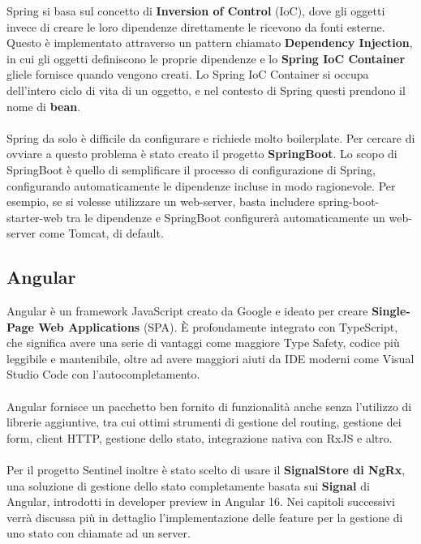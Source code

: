 Spring si basa sul concetto di \textbf{Inversion of Control} (IoC), dove gli oggetti invece di creare le loro dipendenze direttamente le ricevono da fonti esterne.
Questo \`e implementato attraverso un pattern chiamato \textbf{Dependency Injection}, in cui gli oggetti definiscono le proprie dipendenze e lo \textbf{Spring IoC Container}
gliele fornisce quando vengono creati.
Lo Spring IoC Container si occupa dell'intero ciclo di vita di un oggetto, e nel contesto di Spring questi prendono il nome di \textbf{bean}.
\\\\
Spring da solo \`e difficile da configurare e richiede molto boilerplate. Per cercare di ovviare a questo problema \`e stato creato il progetto \textbf{SpringBoot}.
Lo scopo di SpringBoot \`e quello di semplificare il processo di configurazione di Spring, configurando automaticamente le dipendenze incluse in modo ragionevole.
Per esempio, se si volesse utilizzare un web-server, basta includere spring-boot-starter-web tra le dipendenze e SpringBoot configurer\`a automaticamente un web-server come Tomcat, di default.
\subsection{Angular}
Angular \`e un framework JavaScript creato da Google e ideato per creare \textbf{Single-Page Web Applications} (SPA). \`E profondamente integrato con TypeScript,
che significa avere una serie di vantaggi come maggiore Type Safety, codice pi\`u leggibile e mantenibile, oltre ad avere maggiori aiuti da IDE moderni come Visual Studio Code
con l'autocompletamento.
\\\\
Angular fornisce un pacchetto ben fornito di funzionalit\`a anche senza l'utilizzo di librerie aggiuntive, tra cui ottimi strumenti di gestione del
routing, gestione dei form, client HTTP, gestione dello stato, integrazione nativa con RxJS e altro.
\\\\
Per il progetto Sentinel inoltre \`e stato scelto di usare il \textbf{SignalStore di NgRx}, una soluzione di gestione dello stato completamente basata sui \textbf{Signal} di Angular,
introdotti in developer preview in Angular 16. Nei capitoli successivi verr\`a discussa pi\`u in dettaglio l'implementazione delle feature per la gestione di uno stato
con chiamate ad un server.
